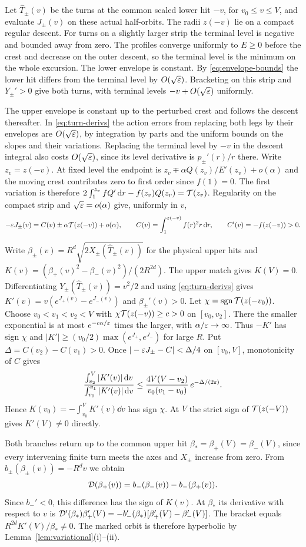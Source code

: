Let $\widehat T_\pm(v)$ be the turns at the common scaled lower hit
$-v$, for $v_0\le v\le V$, and evaluate $J_\pm(v)$ on these actual
half-orbits. The radii $z(-v)$ lie on a compact regular descent.
For turns on a slightly larger strip the terminal level is negative
and bounded away from zero. The profiles converge uniformly to
$E\ge0$ before the crest and decrease on the outer descent, so the
terminal level is the minimum on the whole excursion. The lower envelope is constant.
By \eqref{eq:envelope-bounds} the lower hit differs from the terminal
level by $O(\sqrt{\varepsilon})$. Bracketing on this strip and $Y_\pm'>0$
give both turns, with terminal levels $-v+O(\sqrt{\varepsilon})$ uniformly.

The upper envelope is constant up to the perturbed crest and follows
the descent thereafter. In \eqref{eq:turn-derivs} the action errors
from replacing both legs by their envelopes are $O(\sqrt{\varepsilon})$,
by integration by parts and the uniform bounds on the slopes and
their variations. Replacing the terminal level by $-v$ in the descent
integral also costs $O(\sqrt{\varepsilon})$, since its level derivative is
$p_\pm'(r)/r$ there. Write $z_v=z(-v)$. At fixed level the endpoint
is $z_v\mp\alpha Q(z_v)/E'(z_v)+o(\alpha)$ and the moving crest
contributes zero to first order since $f(1)=0$. The first variation
is therefore $2\int_1^{z_v} fQ'\,\mathrm{d} r-f(z_v)Q(z_v)=\mathcal{T}(z_v)$.
Regularity on the compact strip and $\sqrt{\varepsilon}=o(\alpha)$ give, uniformly in $v$,
\[
 -\varepsilon J_\pm(v)=C(v)\pm\alpha\mathcal{T}(z(-v))+o(\alpha),\qquad
 C(v)=\int_1^{z(-v)} f(r)^2r\,\mathrm{d} r,\qquad C'(v)=-f(z(-v))>0 .
\]

Write $\beta_\pm(v)=R^d\sqrt{2X_\pm(\widehat T_\pm(v))}$ for the
physical upper hits and $K(v)=(\beta_+(v)^2-\beta_-(v)^2)/(2R^{2d})$.
The upper match gives $K(V)=0$. Differentiating
$Y_\pm(\widehat T_\pm(v))=v^2/2$ and using \eqref{eq:turn-derivs}
gives $K'(v)=v(e^{J_+(v)}-e^{J_-(v)})$ and $\beta_\pm'(v)>0$.
Let $\chi=\operatorname{sgn}\mathcal{T}(z(-v_0))$. Choose $v_0<v_1<v_2<V$ with
$\chi\mathcal{T}(z(-v))\ge c>0$ on $[v_0,v_2]$. There the smaller exponential
is at most $e^{-c\alpha/\varepsilon}$ times the larger, with $\alpha/\varepsilon\to\infty$.
Thus $-K'$ has sign
$\chi$ and $|K'|\ge(v_0/2)\max(e^{J_+},e^{J_-})$ for large $R$.
Put $\Delta=C(v_2)-C(v_1)>0$. Once
$|-\varepsilon J_\pm-C|<\Delta/4$ on $[v_0,V]$, monotonicity of $C$ gives
\[
 \frac{\int_{v_2}^{V}|K'(v)|\,\mathrm{d} v}{\int_{v_0}^{v_1}|K'(v)|\,\mathrm{d} v}
 \le \frac{4V(V-v_2)}{v_0(v_1-v_0)}\,e^{-\Delta/(2\varepsilon)} .
\]
Hence $K(v_0)=-\int_{v_0}^{V}K'(v)\dd v$ has sign $\chi$.
At $V$ the strict sign of $\mathcal{T}(z(-V))$ gives $K'(V)\ne0$ directly.

Both branches return up to the common upper hit
$\beta_*=\beta_+(V)=\beta_-(V)$, since every intervening finite turn
meets the axes and $X_\pm$ increase from zero. From
$b_\pm(\beta_\pm(v))=-R^d v$ we obtain
\[
 \mathcal{D}(\beta_+(v))=b_-(\beta_-(v))-b_-(\beta_+(v)).
\]
Since $b_-'<0$, this difference has the sign of $K(v)$.
At $\beta_*$ its derivative with respect to $v$ is
$\mathcal{D}'(\beta_*)\beta_+'(V)=-b_-'(\beta_*)[\beta_+'(V)-\beta_-'(V)]$.
The bracket equals $R^{2d}K'(V)/\beta_*\ne0$. The marked orbit is
therefore hyperbolic by Lemma~\ref{lem:variational}\textup{(i)--(ii)}.
